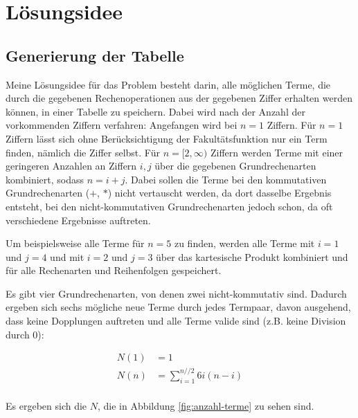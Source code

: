 \documentclass[a4paper,10pt,ngerman]{scrartcl}
\title{\Aufgabe}
\author{\Name\\Team-ID: \Einsendenummer}
\date{\today}
\begin{document}
\maketitle
\tableofcontents

\section{Lösungsidee}
\label{sec:idea}
\subsection{Generierung der Tabelle}
Meine Lösungsidee für das Problem besteht darin, alle möglichen Terme, die durch die gegebenen Rechenoperationen aus der gegebenen Ziffer erhalten werden können, in einer Tabelle zu speichern.
Dabei wird nach der Anzahl der vorkommenden Ziffern verfahren:
Angefangen wird bei $n=1$ Ziffern.
Für $n=1$ Ziffern lässt sich ohne Berücksichtigung der Fakultätsfunktion nur ein Term finden, nämlich die Ziffer selbst.
Für $n=[2, \infty)$ Ziffern werden Terme mit einer geringeren Anzahlen an Ziffern $i,j$ über die gegebenen Grundrechenarten kombiniert, sodass $n=i+j$.
Dabei sollen die Terme bei den kommutativen Grundrechenarten ($+$, $*$) nicht vertauscht werden, da dort dasselbe Ergebnis entsteht, bei den nicht-kommutativen Grundrechenarten jedoch schon, da oft verschiedene Ergebnisse auftreten.

Um beispielsweise alle Terme für $n=5$ zu finden, werden alle Terme mit $i=1$ und $j=4$ und mit $i=2$ und $j=3$ über das kartesische Produkt kombiniert und für alle Rechenarten und Reihenfolgen gespeichert.

Es gibt vier Grundrechenarten, von denen zwei nicht-kommutativ sind.
Dadurch ergeben sich sechs mögliche neue Terme durch jedes Termpaar, davon ausgehend, dass keine Dopplungen auftreten und alle Terme valide sind (z.B. keine Division durch 0):

\begin{align*}
N(1) &= 1 \\
N(n) &= \sum_{i=1}^{n // 2}6i(n-i) \\
\end{align*}

Es ergeben sich die $N$, die in Abbildung \ref{fig:anzahl-terme} zu sehen sind.
\end{document}
